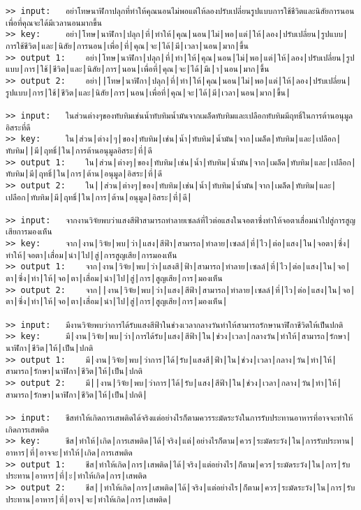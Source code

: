 \documentclass[11pt]{article}
\begin{document}
\begin{Verbatim}[commandchars=\\\{\}]
>> input:	อย่าโทษนาฬิกาปลุกที่ทำให้คุณนอนไม่พอแต่ให้ลองปรับเปลี่ยนรูปแบบการใช้ชีวิตและนิสัยการนอนเพื่อที่คุณจะได้มีเวลานอนมากขึ้น
>> key:		อย่า|โทษ|นาฬิกา|ปลุก|ที่|ทำให้|คุณ|นอน|ไม่|พอ|แต่|ให้|ลอง|ปรับเปลี่ยน|รูปแบบ|การใช้ชีวิต|และ|นิสัย|การนอน|เพื่อ|ที่|คุณ|จะ|ได้|มี|เวลา|นอน|มาก|ขึ้น
>> output 1:	อย่า|โทษ|นาฬิกา|ปลุก|ที่|ทำ|ให้|คุณ|นอน|ไม่|พอ|แต่|ให้|ลอง|ปรับเปลี่ยน|รูปแบบ|การ|ใช้|ชีวิต|และ|นิสัย|การ|นอน|เพื่อที่|คุณ|จะ|ได้|มีเ|า|นอน|มาก|ขึ้น
>> output 2:	อย่า||โทษ|นาฬิกา|ปลุก|ที่|ทำ|ให้|คุณ|นอน|ไม่|พอ|แต่|ให้|ลอง|ปรับเปลี่ยน|รูปแบบ|การ|ใช้|ชีวิต|และ|นิสัย|การ|นอน|เพื่อที่|คุณ|จะ|ได้|มี|เวลา|นอน|มาก|ขึ้น|

>> input:	ในส่วนต่างๆของทับทิมเช่นน้ำทับทิมน้ำมันจากเมล็ดทับทิมและเปลือกทับทิมมีฤทธิ์ในการต้านอนุมูลอิสระที่ดี
>> key:		ใน|ส่วน|ต่าง|ๆ|ของ|ทับทิม|เช่น|น้ำ|ทับทิม|น้ำมัน|จาก|เมล็ด|ทับทิม|และ|เปลือก|ทับทิม||มี|ฤทธิ์|ใน|การต้านอนุมูลอิสระ|ที่|ดี
>> output 1:	ใน|ส่วน|ต่างๆ|ของ|ทับทิม|เช่น|น้ำ|ทับทิม|น้ำมัน|จาก|เมล็ด|ทับทิม|และ|เปลือก|ทับทิม|มี|ฤทธิ์|ใน|การ|ต้าน|อนุมูล|อิสระ|ที่|ดี
>> output 2:	ใน||ส่วน|ต่างๆ|ของ|ทับทิม|เช่น|น้ำ|ทับทิม|น้ำมัน|จาก|เมล็ด|ทับทิม|และ|เปลือก|ทับทิม|มี|ฤทธิ์|ใน|การ|ต้าน|อนุมูล|อิสระ|ที่|ดี|

>> input:	จากงานวิจัยพบว่าแสงสีฟ้าสามารถทำลายเซลล์ที่ไวต่อแสงในจอตาซึ่งทำให้จอตาเสื่อมนำไปสู่การสูญเสียการมองเห็น
>> key:		จาก|งาน|วิจัย|พบ|ว่า|แสง|สีฟ้า|สามารถ|ทำลาย|เซลล์|ที่|ไว|ต่อ|แสง|ใน|จอตา|ซึ่ง|ทำให้|จอตา|เสื่อม|นำ|ไป|สู่|การสูญเสีย|การมองเห็น
>> output 1:	จาก|งาน|วิจัย|พบ|ว่า|แสงสี|ฟ้า|สามารถ|ทำลาย|เซลล์|ที่|ไว|ต่อ|แสง|ใน|จอ|ตา|ซึ่ง|ทำ|ให้|จอ|ตา|เสื่อม|นำ|ไป|สู่|การ|สูญเสีย|การ|มองเห็น
>> output 2:	จาก||งาน|วิจัย|พบ|ว่า|แสง|สีฟ้า|สามารถ|ทำลาย|เซลล์|ที่|ไว|ต่อ|แสง|ใน|จอ|ตา|ซึ่ง|ทำ|ให้|จอ|ตา|เสื่อม|นำ|ไป|สู่|การ|สูญเสีย|การ|มองเห็น|

>> input:	มีงานวิจัยพบว่าการได้รับแสงสีฟ้าในช่วงเวลากลางวันทำให้สามารถรักษานาฬิกาชีวิตให้เป็นปกติ
>> key:		มี|งาน|วิจัย|พบ|ว่า|การได้รับ|แสง|สีฟ้า|ใน|ช่วง|เวลา|กลางวัน|ทำให้|สามารถ|รักษา|นาฬิกา|ชีวิต|ให้|เป็น|ปกติ
>> output 1:	มี|งาน|วิจัย|พบ|ว่าการ|ได้|รับ|แสงสี|ฟ้า|ใน|ช่วง|เวลา|กลาง|วัน|ทำ|ให้|สามารถ|รักษา|นาฬิกา|ชีวิต|ให้|เป็น|ปกติ
>> output 2:	มี||งาน|วิจัย|พบ|ว่าการ|ได้|รับ|แสง|สีฟ้า|ใน|ช่วง|เวลา|กลาง|วัน|ทำ|ให้|สามารถ|รักษา|นาฬิกา|ชีวิต|ให้|เป็น|ปกติ|

>> input:	ชีสทำให้เกิดการเสพติดได้จริงแต่อย่างไรก็ตามควรระมัดระวังในการรับประทานอาหารที่อาจจะทำให้เกิดการเสพติด
>> key:		ชีส|ทำให้|เกิด|การเสพติด|ได้|จริง|แต่|อย่างไรก็ตาม|ควร|ระมัดระวัง|ใน|การรับประทาน|อาหาร|ที่|อาจจะ|ทำให้|เกิด|การเสพติด
>> output 1:	ชีส|ทำให้เกิด|การ|เสพติด|ได้|จริง|แต่อย่างไร|ก็ตาม|ควร|ระมัดระวัง|ใน|การ|รับประทาน|อาหาร|ที่|ะ|ทำให้เกิด|การ|เสพติด
>> output 2:	ชีส||ทำให้เกิด|การ|เสพติด|ได้|จริง|แต่อย่างไร|ก็ตาม|ควร|ระมัดระวัง|ใน|การ|รับประทาน|อาหาร|ที่|อาจ|จะ|ทำให้เกิด|การ|เสพติด|


\end{Verbatim}
\end{document}
